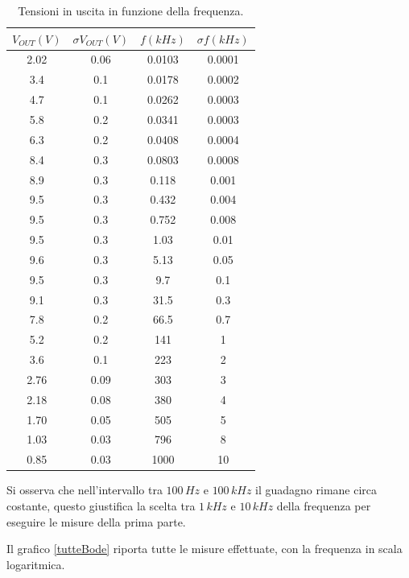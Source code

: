 \documentclass[10pt,a4paper]{article}
\begin{document}
\begin{table}[!htb]\centering
\begin{tabular}{|c|c|c|c|}
\hline
$V_{OUT} (V)$ & $\sigma V_{OUT} (V)$ & $f(kHz)$ & $\sigma f (kHz)$\\
\hline
2.02 & 0.06 & 0.0103 & 0.0001\\
3.4 & 0.1 & 0.0178 & 0.0002\\
4.7 & 0.1 & 0.0262 & 0.0003\\
5.8 & 0.2 & 0.0341 & 0.0003\\
6.3 & 0.2 & 0.0408 & 0.0004\\
8.4 & 0.3 & 0.0803 & 0.0008\\
8.9 & 0.3 & 0.118 & 0.001\\
9.5 & 0.3 & 0.432 & 0.004\\
9.5 & 0.3 & 0.752 & 0.008\\
9.5 & 0.3 & 1.03 & 0.01\\
9.6 & 0.3 & 5.13 & 0.05\\
9.5 & 0.3 & 9.7 & 0.1\\
9.1 & 0.3 & 31.5 & 0.3\\
7.8 & 0.2 & 66.5 & 0.7\\
5.2 & 0.2 & 141 & 1\\
3.6 & 0.1 & 223 & 2\\
2.76 & 0.09 & 303 & 3\\
2.18 & 0.08 & 380 & 4\\
1.70 & 0.05 & 505 & 5\\
1.03 & 0.03 & 796 & 8\\
0.85 & 0.03 & 1000 & 10\\
\hline
\hline
\end{tabular}
\caption{Tensioni in uscita in funzione della frequenza.}
\label{bode}
\end{table}

Si osserva che nell'intervallo tra $100\,Hz$ e $100\,kHz$ il guadagno rimane circa costante, questo giustifica la scelta tra $1 \, kHz$ e $10 \, kHz$ della frequenza per eseguire le misure della prima parte.





Il grafico \ref{tutteBode} riporta tutte le misure effettuate, con la frequenza in scala logaritmica.
\end{document}
